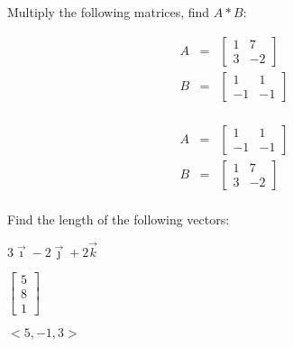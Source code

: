   \begin{problem}
  \item Multiply the following matrices, find $A*B$:
    \begin{subproblem}
    \item 
      \begin{eqnarray*}
        A & = & 
        \left[
          \begin{array}{rr}
            1 &  7 \\ 
            3 & -2
          \end{array}
        \right] \\
        B & = & 
        \left[
          \begin{array}{rr}
            1 &  1 \\
           -1 & -1
          \end{array}
        \right] \\
      \end{eqnarray*}

    \vfill

  \item 
      \begin{eqnarray*}
        A & = & 
        \left[
          \begin{array}{rr}
            1 &  1 \\ 
           -1 & -1
          \end{array}
        \right] \\
        B & = & 
        \left[
          \begin{array}{rr}
            1 &  7 \\
            3 & -2
          \end{array}
        \right] \\
      \end{eqnarray*}

    \vfill

  \end{subproblem}

    \clearpage
  \item Find the length of the following vectors:

    \begin{subproblem}
      \item $3\vec{\imath} - 2\vec{\jmath} + 2\vec{k}$
        \vfill
      \item $\left[\begin{array}{r} 5 \\ 8 \\ 1 \end{array}\right]$
        \vfill
      \item $<5,-1,3>$
        \vfill
    \end{subproblem}

  \end{problem}


